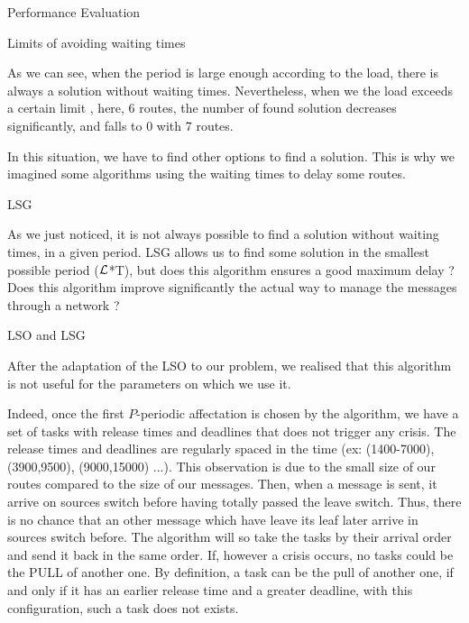 \documentclass[a4paper,10pt]{report}
\begin{document}
\begin{chapter}{Performance Evaluation}
\begin{section}{Limits of avoiding waiting times}
\begin{centering}
   \end{centering}
 
As we can see, when the period is large enough according to the load, there is always a solution without waiting times. Nevertheless, when we the load exceeds a certain limit 
, here, 6 routes, the number of found solution decreases significantly, and falls to 0 with 7 routes.

In this situation, we have to find other options to find a solution. This is why we imagined some algorithms using the waiting times to delay some routes.

\end{section}

\begin{section}{LSG}

As we just noticed, it is not always possible to find a solution without waiting times, in a given period.
LSG allows us to find some solution in the smallest possible period (${\cal L}$*T), but does this algorithm ensures a good maximum delay ?
Does this algorithm improve significantly the actual way to manage the messages through a network ?

\begin{subsection}{LSO and LSG}

After the adaptation of the LSO to our problem, we realised that this algorithm is not useful for the parameters on which we use it. 

Indeed, once the first $P$-periodic affectation is chosen
by the algorithm, we have a set of tasks with release times and deadlines that does not trigger any crisis.
The release times and deadlines are regularly spaced in the time (ex: (1400-7000), (3900,9500), (9000,15000) ...).
This observation is due to the small size of our routes compared to the size of our messages. Then, when a message is sent, it arrive on sources switch before having totally passed the leave switch. Thus, there is no chance that an other message which have leave its leaf later arrive in sources switch before.
The algorithm will so take the tasks by their arrival order and send it back in the same order. If, however a crisis occurs, no tasks could be the PULL
of another one. By definition, a task can be the pull of another one, if and only if it has an earlier release time and a greater deadline, with this configuration, such a task does not exists.


\end{subsection}
\end{section}
\end{chapter}
\end{document}
